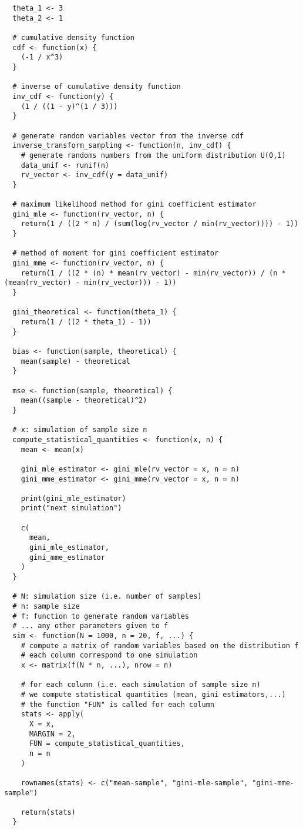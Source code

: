 \documentclass[10pt, a4paper, nofootinbib]{scrartcl}
\begin{document}
\begin{verbatim}
  theta_1 <- 3
  theta_2 <- 1

  # cumulative density function
  cdf <- function(x) {
    (-1 / x^3)
  }

  # inverse of cumulative density function
  inv_cdf <- function(y) {
    (1 / ((1 - y)^(1 / 3)))
  }

  # generate random variables vector from the inverse cdf
  inverse_transform_sampling <- function(n, inv_cdf) {
    # generate randoms numbers from the uniform distribution U(0,1)
    data_unif <- runif(n)
    rv_vector <- inv_cdf(y = data_unif)
  }

  # maximum likelihood method for gini coefficient estimator
  gini_mle <- function(rv_vector, n) {
    return(1 / ((2 * n) / (sum(log(rv_vector / min(rv_vector)))) - 1))
  }

  # method of moment for gini coefficient estimator
  gini_mme <- function(rv_vector, n) {
    return(1 / ((2 * (n) * mean(rv_vector) - min(rv_vector)) / (n * (mean(rv_vector) - min(rv_vector))) - 1))
  }

  gini_theoretical <- function(theta_1) {
    return(1 / ((2 * theta_1) - 1))
  }

  bias <- function(sample, theoretical) {
    mean(sample) - theoretical
  }

  mse <- function(sample, theoretical) {
    mean((sample - theoretical)^2)
  }

  # x: simulation of sample size n
  compute_statistical_quantities <- function(x, n) {
    mean <- mean(x)

    gini_mle_estimator <- gini_mle(rv_vector = x, n = n)
    gini_mme_estimator <- gini_mme(rv_vector = x, n = n)

    print(gini_mle_estimator)
    print("next simulation")

    c(
      mean,
      gini_mle_estimator,
      gini_mme_estimator
    )
  }

  # N: simulation size (i.e. number of samples)
  # n: sample size
  # f: function to generate random variables
  # ... any other parameters given to f
  sim <- function(N = 1000, n = 20, f, ...) {
    # compute a matrix of random variables based on the distribution f
    # each column correspond to one simulation
    x <- matrix(f(N * n, ...), nrow = n)

    # for each column (i.e. each simulation of sample size n)
    # we compute statistical quantities (mean, gini estimators,...)
    # the function "FUN" is called for each column
    stats <- apply(
      X = x,
      MARGIN = 2,
      FUN = compute_statistical_quantities,
      n = n
    )

    rownames(stats) <- c("mean-sample", "gini-mle-sample", "gini-mme-sample")

    return(stats)
  }
\end{verbatim}
\end{document}
